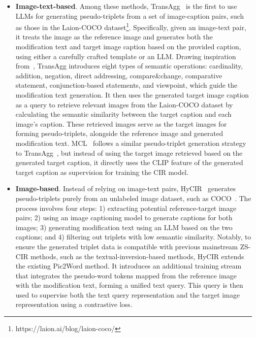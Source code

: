\begin{itemize}
    \item \textbf{Image-text-based}. Among these methods, TransAgg~\cite{transagg} is the first to use LLMs for generating pseudo-triplets from a set of image-caption pairs, such as those in the Laion-COCO dataset\footnote{https://laion.ai/blog/laion-coco/}. Specifically, given an image-text pair, it treats the image as the reference image and generates both the modification text and target image caption based on the provided caption, using either a carefully crafted template or an LLM. Drawing inspiration from~\cite{liu2021image}, TransAgg introduces eight types of semantic operations: cardinality, addition, negation, direct addressing, compare\&change, comparative statement, conjunction-based statements, and viewpoint, which guide the modification text generation. It then uses the generated target image caption as a query to retrieve relevant images from the Laion-COCO dataset by calculating the semantic similarity between the target caption and each image's caption. These retrieved images serve as the target images for forming pseudo-triplets, alongside the reference image and generated modification text.
MCL~\cite{mcl} follows a similar pseudo-triplet generation strategy to TransAgg~\cite{transagg}, but instead of using the target image retrieved based on the generated target caption, it directly uses the CLIP feature of the generated target caption as supervision for training the CIR model.
   \item \textbf{Image-based}. Instead of relying on image-text pairs, HyCIR~\cite{hycir} generates pseudo-triplets purely from an unlabeled image dataset, such as COCO~\cite{lin2014microsoft}. The process involves four steps: 1) extracting potential reference-target image pairs; 2) using an image captioning model to generate captions for both images; 3) generating modification text using an LLM based on the two captions; and 4) filtering out triplets with low semantic similarity. Notably, to ensure the generated triplet data is compatible with previous mainstream ZS-CIR methods, such as the textual-inversion-based methods, HyCIR extends the existing Pic2Word method. It introduces an additional training stream that integrates the pseudo-word tokens mapped from the reference image with the modification text, forming a unified text query. This query is then used to supervise both the text query representation and the target image representation using a contrastive loss.

\end{itemize}
